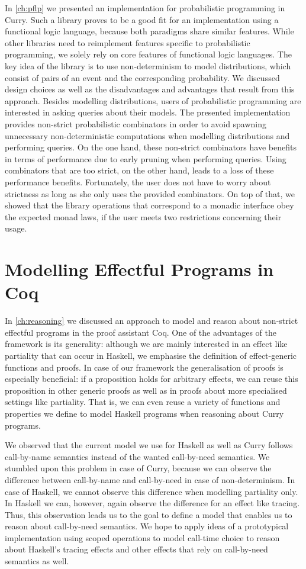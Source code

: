 In \autoref{ch:pflp} we presented an implementation for probabilistic programming in Curry.
Such a library proves to be a good fit for an implementation using a functional logic language, because both paradigms share similar features.
While other libraries need to reimplement features specific to probabilistic programming, we solely rely on core features of functional logic languages.
The key idea of the library is to use non\--determinism to model distributions, which consist of pairs of an event and the corresponding probability.
We discussed design choices as well as the disadvantages and advantages that result from this approach.
Besides modelling distributions, users of probabilistic programming are interested in asking queries about their models.
The presented implementation provides non\--strict probabilistic combinators in order to avoid spawning unnecessary non\--deterministic computations when modelling distributions and performing queries.
On the one hand, these non\--strict combinators have benefits in terms of performance due to early pruning when performing queries.
Using combinators that are too strict, on the other hand, leads to a loss of these performance benefits.
Fortunately, the user does not have to worry about strictness as long as she only uses the provided combinators.
On top of that, we showed that the library operations that correspond to a monadic interface obey the expected monad laws, if the user meets two restrictions concerning their usage.

\section{Modelling Effectful Programs in Coq}

In \autoref{ch:reasoning} we discussed an approach to model and reason about non\--strict effectful programs in the proof assistant Coq.
One of the advantages of the framework is its generality: although we are mainly interested in an effect like partiality that can occur in Haskell, we emphasise the definition of effect\--generic functions and proofs.
In case of our framework the generalisation of proofs is especially beneficial: if a proposition holds for arbitrary effects, we can reuse this proposition in other generic proofs as well as in proofs about more specialised settings like partiality.
That is, we can even reuse a variety of functions and properties we define to model Haskell programs when reasoning about Curry programs.

We observed that the current model we use for Haskell as well as Curry follows call\--by\--name semantics instead of the wanted call\--by\--need semantics.
We stumbled upon this problem in case of Curry, because we can observe the difference between call\--by\--name and call\--by\--need in case of non\--determinism.
In case of Haskell, we cannot observe this difference when modelling partiality only.
In Haskell we can, however, again observe the difference for an effect like tracing.
Thus, this observation leads us to the goal to define a model that enables us to reason about call\--by\--need semantics.
We hope to apply ideas of a prototypical implementation using scoped operations to model call\--time choice to reason about Haskell's tracing effects and other effects that rely on call\--by\--need semantics as well.
